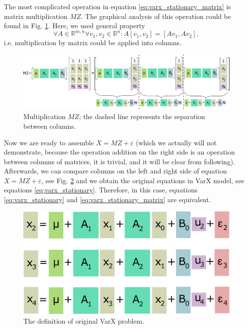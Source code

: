 \documentclass{article}
\begin{document}
 The most complicated operation in equation \eqref{eq:varx_stationary_matrix} is matrix multiplication $MZ$. The graphical analysis of this operation could be found in Fig. \ref{fig:varx3}.
 Here, we used general property
 \begin{displaymath}
  \forall A \in \mathbb{R}^{m,n} \forall v_1,v_2 \in \mathbb{R}^n: A\left[ v_1, v_2 \right ] = \left[ A v_1, Av_2 \right] ,
 \end{displaymath}
 i.e. multiplication by matrix could be applied into columns.

 \begin{figure}[h!]
  \centering
    \includegraphics[scale=0.2]{varx3.pdf}
  \caption{Multiplication $MZ$; the dashed line represents the separation between columns.}
  \label{fig:varx3}
 \end{figure}
 
 Now we are ready to assemble $X = MZ + \varepsilon$ (which we actually will not demonstrate, because the operation addition on the right side is an operation between columns of matrices, it is trivial, and it will be clear from following).
 Afterwards, we can compare columns on the left and right side of equation $X = MZ + \varepsilon$, see Fig. \ref{fig:varx4} and we obtain the original equations in VarX model, see equations \eqref{eq:varx_stationary}.
 Therefore, in this case, equations \eqref{eq:varx_stationary} and \eqref{eq:varx_stationary_matrix} are equivalent.

 \begin{figure}[h!]
  \centering
    \includegraphics[scale=0.2]{varx4.pdf}
  \caption{The definition of original VarX problem.}
  \label{fig:varx4}
 \end{figure}
\end{document}
